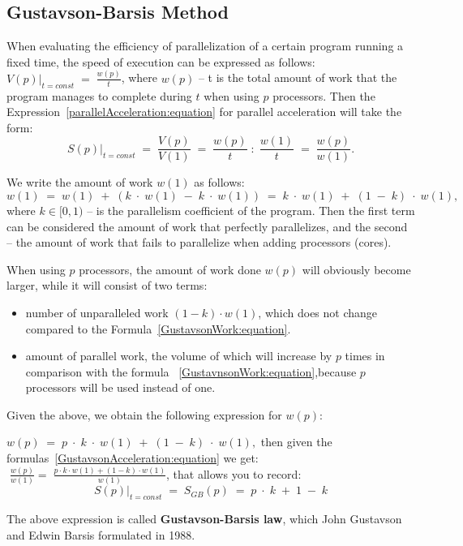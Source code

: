 { %
	\subsection{Gustavson-Barsis Method}
	\par When evaluating the efficiency of parallelization of a certain program running a fixed time, the speed of execution can be expressed as follows: $\left.V(p)\right|_{t=const}\;=\;\frac {w(p)}t$, where $w(p)$ – t is the total amount of work that the program manages to complete during $ t $ when using $p$ processors. Then the Expression~\eqref{parallelAcceleration:equation} for parallel acceleration will take the form:
	\begin{equation}
		\label{GustavsonAcceleration:equation}
		\left.S(p)\right|_{t=const}\;=\;\frac{V(p)}{V(1)}\;=\;\frac{w(p)}t\;:\;\frac{w(1)}t\;=\;\frac{w(p)}{w(1)}.
	\end{equation}
	\par We write the amount of work $w (1)$ as follows:
	\begin{equation}
		\label{GustavsonWork:equation}
		w(1)\;=\;w(1)\;+\;(k\;\cdot\;w(1)\;-\;k\;\cdot\;w(1))\;=\;k\;\cdot\;w(1)\;+\;(1\;-\;k)\;\cdot\;w(1),
	\end{equation}
	where $k\in\lbrack0,1)$ – is the parallelism coefficient of the program. Then the first term can be considered the amount of work that perfectly parallelizes, and the second – the amount of work that fails to parallelize when adding processors (cores).
	\par When using $p$ processors, the amount of work done $w(p)$ will obviously become larger, while it will consist of two terms:
	\begin{itemize}
		\item number of unparalleled work $(1-k)\cdot w(1)$, which does not change compared to the Formula~\eqref{GustavsonWork:equation}.
		\item amount of parallel work, the volume of which will increase by $p$ times in comparison with the formula ~\eqref{GustavnsonWork:equation},because $p$ processors will be used instead of one.
	\end{itemize}
	\par Given the above, we obtain the following expression for $w(p)$:
	\par$w(p)\;=\;p\;\cdot\;k\;\cdot\;w(1)\;+\;(1\;-\;k)\;\cdot\;w(1),$ then given the formulas~\eqref{GustavsonAcceleration:equation} we get: $\;\frac{w(p)}{w(1)}=\;\frac{p\cdot k\cdot w(1)+(1-k)\cdot w(1)}{w(1)}$, that allows you to record:
	\begin{equation}
		\left.S(p)\right|_{t=const}\;=\;S_{GB}(p)\;=\;p\;\cdot\;k\;+\;1\;-\;k
	\end{equation}
	\par The above expression is called \textbf {Gustavson-Barsis law}, which John Gustavson and Edwin Barsis formulated in 1988.
	\par
}